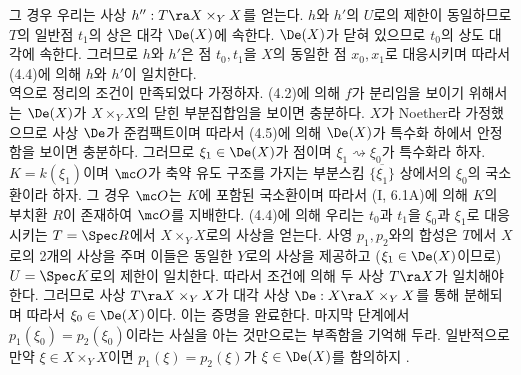 	그 경우 우리는 사상 $h'':T\ra X\times_YX$를 얻는다.
	$h$와 $h'$의 $U$로의 제한이 동일하므로 $T$의 일반점 $t_1$의 상은 대각 $\De(X)$에 속한다.
	$\De(X)$가 닫혀 있으므로 $t_0$의 상도 대각에 속한다.
	그러므로 $h$와 $h'$은 점 $t_0,t_1$을 $X$의 동일한 점 $x_0,x_1$로 대응시키며 따라서 (4.4)에 의해 $h$와 $h'$이 일치한다.\\
	역으로 정리의 조건이 만족되었다 가정하자.
	(4.2)에 의해 $f$가 분리임을 보이기 위해서는 $\De(X)$가 $X\times_YX$의 닫힌 부분집합임을 보이면 충분하다.
	$X$가 Noether라 가정했으므로 사상 $\De$가 준컴팩트이며 따라서 (4.5)에 의해 $\De(X)$가 특수화 하에서 안정함을 보이면 충분하다.
	그러므로 $\xi_1\in\De(X)$가 점이며 $\xi_1\rightsquigarrow\xi_0$가 특수화라 하자.
	$K=k(\xi_1)$이며 $\mc O$가 축약 유도 구조를 가지는 부분스킴 $\overline{\{\xi_1\}}$ 상에서의 $\xi_0$의 국소환이라 하자.
	그 경우 $\mc O$는 $K$에 포함된 국소환이며 따라서 (I, 6.1A)에 의해 $K$의 부치환 $R$이 존재하여 $\mc O$를 지배한다.
	(4.4)에 의해 우리는 $t_0$과 $t_1$을 $\xi_0$과 $\xi_1$로 대응시키는 $T=\Spec R$에서 $X\times_YX$로의 사상을 얻는다.
	사영 $p_1,p_2$와의 합성은 $T$에서 $X$로의 2개의 사상을 주며 이들은 동일한 $Y$로의 사상을 제공하고
	($\xi_1\in\De(X)$이므로) $U=\Spec K$로의 제한이 일치한다. 따라서 조건에 의해 두 사상 $T\ra X$가 일치해야 한다.
	그러므로 사상 $T\ra X\times_YX$가 대각 사상 $\De:X\ra X\times_YX$를 통해 분해되며 따라서 $\xi_0\in\De(X)$이다.
	이는 증명을 완료한다. 마지막 단계에서 $p_1(\xi_0)=p_2(\xi_0)$이라는 사실을 아는 것만으로는 부족함을 기억해 두라.
	일반적으로 만약 $\xi\in X\times_YX$이면 $p_1(\xi)=p_2(\xi)$가 $\xi\in\De(X)$를 함의하지 .
	
